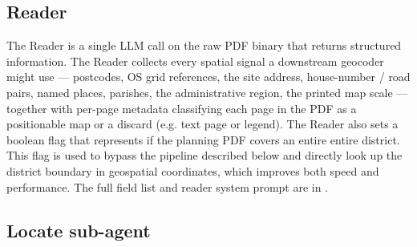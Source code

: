 \documentclass[11pt]{article}
\begin{document}

\subsection{Reader}
\label{subsection:reader}

The Reader is a single LLM call on the raw PDF binary that returns structured information. The Reader collects every spatial signal a downstream geocoder might use --- postcodes, OS grid references, the site address, house-number / road pairs, named places, parishes, the administrative region, the printed map scale --- together with per-page metadata classifying each page in the PDF as a positionable map or a discard (e.g. text page or legend). The Reader also sets a boolean flag that represents if the planning PDF covers an entire entire district. This flag is used to bypass the pipeline described below and directly look up the district boundary in geospatial coordinates, which improves both speed and performance. The full field list and reader system prompt are in .

\subsection{Locate sub-agent}
\label{subsection:locate-sub}
\end{document}
